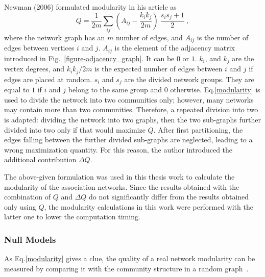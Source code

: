 Newman (2006) formulated modularity in his article as
\begin{equation} %
	Q = \frac {1} {2 m}\sum_ {ij} (A_{ij} - \frac {k_{i} k_{j}}{2 m}) \
	\frac {s_{i} s_{j} + 1} {2}\ ,
	\label{modularity}
\end{equation}
where the network graph has an $m$ number of edges, and $A_{ij}$ is the number of edges between vertices $i$ and $j$. $A_{ij}$ is the element of the adjacency matrix introduced in Fig.~\ref{figure-adjacency_graph}. It can be $0$ or $1$. $k_{i}$, and $k_{j}$ are the vertex degrees, and ${k_{i} k_{j}}/{2 m}$ is the expected number of edges between $i$ and $j$ if edges are placed at random. $s_{i}$ and $s_{j}$ are the divided network groups. They are equal to $1$ if $i$ and $j$ belong to the same group and $0$ otherwise. Eq.\eqref{modularity} is used to divide the network into two communities only; however, many networks may contain more than two communities. Therefore, a repeated division into two is adapted: dividing the network into two graphs, then the two sub-graphs further divided into two only if that would maximize $Q$. After first partitioning, the edges falling between the further divided sub-graphs are neglected, leading to a wrong maximization quantity. For this reason, the author introduced the additional contribution $\Delta Q$.~\cite{Newman8577}

The above-given formulation was used in this thesis work to calculate the modularity of the association networks. Since the results obtained with the combination of $Q$ and $\Delta Q$ do not significantly differ from the results obtained only using $Q$, the modularity calculations in this work were performed with the latter one to lower the computation timing.

\subsubsection*{Null Models}
As Eq.\eqref{modularity} gives a clue, the quality of a real network modularity can be measured by comparing it with the community structure in a random graph~\cite{GirvanNewman2004}. 

